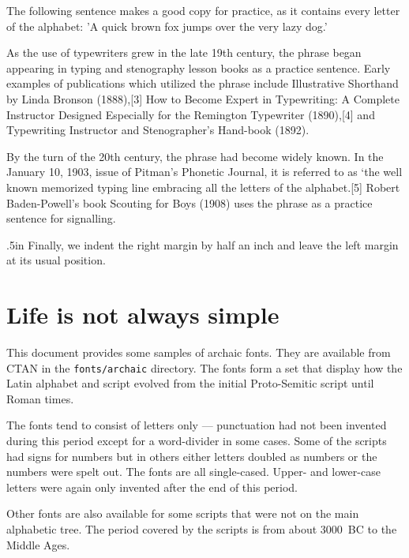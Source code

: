 {{The following sentence makes a good copy for practice, as it contains every letter of the alphabet: 'A quick brown fox jumps over the very lazy dog.'\cite{Tufte2006}

As the use of typewriters grew in the late 19th century, the phrase began appearing in typing and stenography lesson books as a practice sentence. Early examples of publications which utilized the phrase include Illustrative Shorthand by Linda Bronson (1888),[3] How to Become Expert in Typewriting: A Complete Instructor Designed Especially for the Remington Typewriter (1890),[4] and Typewriting Instructor and Stenographer's Hand-book (1892). 

By the turn of the 20th century, the phrase had become widely known. In the January 10, 1903, issue of Pitman's Phonetic Journal, it is referred to as `the well known memorized typing line embracing all the letters of the alphabet.[5] Robert Baden-Powell's book Scouting for Boys (1908) uses the phrase as a practice sentence for signalling\cite{baden1908}.
\par}

\bottomline

\medskip

{\rightskip .5in Finally, we indent the right margin by half
an inch and leave the left margin at its usual position.\par}




\section{Life is not always simple}
 This document provides some samples of archaic fonts. They are
available from CTAN in the \texttt{fonts/archaic} directory. The fonts
form a set that display how the Latin alphabet and script evolved from the
initial Proto-Semitic script until Roman times.

    The fonts tend to consist of letters only --- punctuation had not 
been invented during this period except for a word-divider in some cases.
Some of the scripts had signs for numbers but in others either letters
doubled as numbers or the numbers were spelt out. The fonts are all
single-cased. Upper- and lower-case letters were again only invented after
the end of this period.

    Other fonts are also available for some scripts that were not on the
main alphabetic tree. The period covered by the scripts is from about 
3000~BC to the Middle Ages.

}
